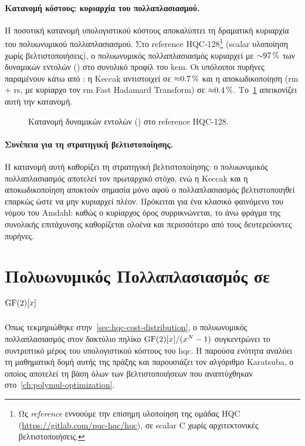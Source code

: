 \paragraph{Κατανομή κόστους: κυριαρχία του πολλαπλασιασμού.}
Η ποσοτική κατανομή υπολογιστικού κόστους αποκαλύπτει τη δραματική κυριαρχία
του πολυωνυμικού πολλαπλασιασμού.
Στο reference HQC-128\footnote{Ως \emph{reference} εννοούμε την επίσημη υλοποίηση της ομάδας HQC (\url{https://gitlab.com/pqc-hqc/hqc}), σε scalar C χωρίς αρχιτεκτονικές βελτιστοποιήσεις.} (scalar υλοποίηση χωρίς βελτιστοποιήσεις), ο πολυωνυμικός
πολλαπλασιασμός κυριαρχεί με ${\sim}\SI{97}{\percent}$ των δυναμικών εντολών (\instret) στο
συνολικό προφίλ του \gls{kem}. Οι υπόλοιποι πυρήνες παραμένουν κάτω από :
η Keccak αντιστοιχεί σε ${\approx}\SI{0.7}{\percent}$ και η αποκωδικοποίηση
(\gls{rm} + \gls{rs}, με κυρίαρχο τον \gls{rm} Fast Hadamard
Transform) σε ${\approx}\SI{0.4}{\percent}$.
Το~\cref{fig:hqc-pie-ref} απεικονίζει αυτή την κατανομή.

\begin{figure}[htbp]
  \centering
  \resizebox{0.75\linewidth}{!}{}
  \caption{Κατανομή δυναμικών εντολών (\instret) στο reference HQC-128.}
  \label{fig:hqc-pie-ref}
\end{figure}

\paragraph{Συνέπεια για τη στρατηγική βελτιστοποίησης.}
Η κατανομή αυτή καθορίζει τη στρατηγική βελτιστοποίησης: ο πολυωνυμικός
πολλαπλασιασμός αποτελεί τον πρωταρχικό στόχο,
ενώ η Keccak και η αποκωδικοποίηση αποκτούν σημασία μόνο αφού ο πολλαπλασιασμός
βελτιστοποιηθεί επαρκώς ώστε να μην κυριαρχεί πλέον. Πρόκειται για ένα κλασικό
φαινόμενο του νόμου του Amdahl: καθώς ο κυρίαρχος όρος συρρικνώνεται, το άνω φράγμα της
συνολικής επιτάχυνσης καθορίζεται ολοένα και περισσότερο από τους δευτερεύοντες
πυρήνες.

\section{Πολυωνυμικός Πολλαπλασιασμός σε \texorpdfstring{$\mathrm{GF}(2)[x]$}{GF(2)[x]}}
\label{sec:polymul-theory}

Όπως τεκμηριώθηκε στην~\cref{sec:hqc-cost-distribution}, ο πολυωνυμικός
πολλαπλασιασμός στον δακτύλιο πηλίκο $\mathrm{GF}(2)[x]/(x^{N}-1)$ συγκεντρώνει το συντριπτικό
μέρος του υπολογιστικού κόστους του \gls{hqc}.
Η παρούσα ενότητα αναλύει τη μαθηματική δομή αυτής της πράξης και παρουσιάζει τον
αλγόριθμο Karatsuba, ο οποίος αποτελεί τη βάση όλων των βελτιστοποιήσεων που
αναπτύχθηκαν στο~\cref{ch:polymul-optimization}.


